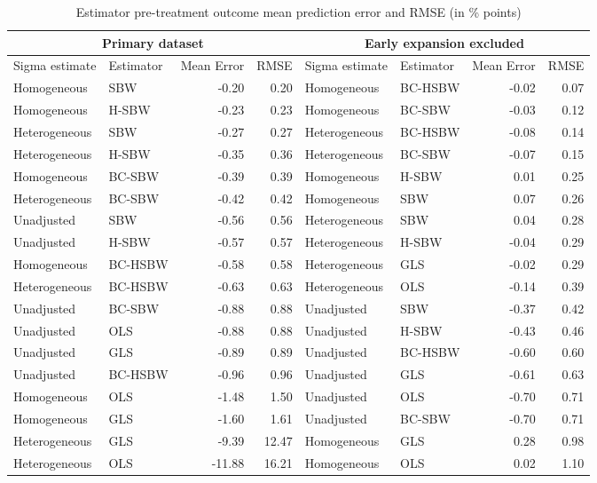\begin{table}\caption{Estimator pre-treatment outcome mean prediction error and RMSE (in \% points)}\label{tab:pretxpredfullcc}
\centering
\begin{tabular}{llrrllrr}
\hline
\multicolumn{4}{c}{Primary dataset} & \multicolumn{4}{c}{Early expansion 
 excluded} \\ 
 \hline
Sigma estimate & Estimator & Mean Error & RMSE & Sigma estimate & Estimator & Mean Error & RMSE \\ 
\hline
Homogeneous & SBW & -0.20 & 0.20 & Homogeneous & BC-HSBW & -0.02 & 0.07 \\ 
Homogeneous & H-SBW & -0.23 & 0.23 & Homogeneous & BC-SBW & -0.03 & 0.12 \\ 
Heterogeneous & SBW & -0.27 & 0.27 & Heterogeneous & BC-HSBW & -0.08 & 0.14 \\ 
Heterogeneous & H-SBW & -0.35 & 0.36 & Heterogeneous & BC-SBW & -0.07 & 0.15 \\ 
Homogeneous & BC-SBW & -0.39 & 0.39 & Homogeneous & H-SBW & 0.01 & 0.25 \\ 
Heterogeneous & BC-SBW & -0.42 & 0.42 & Homogeneous & SBW & 0.07 & 0.26 \\ 
Unadjusted & SBW & -0.56 & 0.56 & Heterogeneous & SBW & 0.04 & 0.28 \\ 
Unadjusted & H-SBW & -0.57 & 0.57 & Heterogeneous & H-SBW & -0.04 & 0.29 \\ 
Homogeneous & BC-HSBW & -0.58 & 0.58 & Heterogeneous & GLS & -0.02 & 0.29 \\ 
Heterogeneous & BC-HSBW & -0.63 & 0.63 & Heterogeneous & OLS & -0.14 & 0.39 \\ 
Unadjusted & BC-SBW & -0.88 & 0.88 & Unadjusted & SBW & -0.37 & 0.42 \\ 
Unadjusted & OLS & -0.88 & 0.88 & Unadjusted & H-SBW & -0.43 & 0.46 \\ 
Unadjusted & GLS & -0.89 & 0.89 & Unadjusted & BC-HSBW & -0.60 & 0.60 \\ 
Unadjusted & BC-HSBW & -0.96 & 0.96 & Unadjusted & GLS & -0.61 & 0.63 \\ 
Homogeneous & OLS & -1.48 & 1.50 & Unadjusted & OLS & -0.70 & 0.71 \\ 
Homogeneous & GLS & -1.60 & 1.61 & Unadjusted & BC-SBW & -0.70 & 0.71 \\ 
Heterogeneous & GLS & -9.39 & 12.47 & Homogeneous & GLS & 0.28 & 0.98 \\ 
Heterogeneous & OLS & -11.88 & 16.21 & Homogeneous & OLS & 0.02 & 1.10 \\ 
 \hline
\end{tabular}
\end{table}

